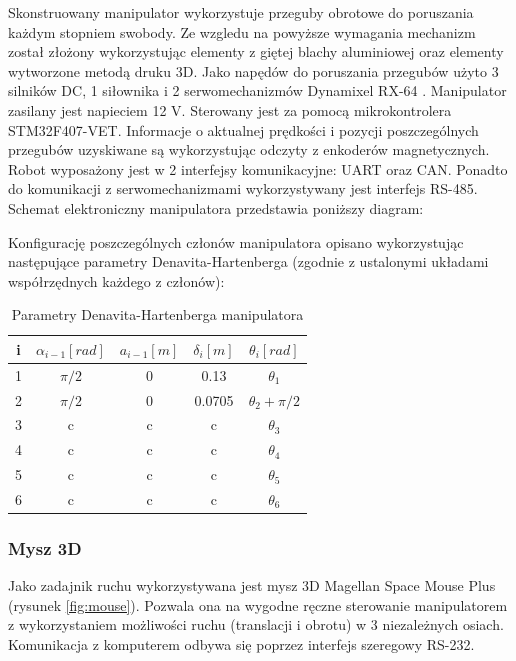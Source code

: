 \documentclass[a4paper, 12pt, twoside]{article}
\begin{document}
Skonstruowany manipulator wykorzystuje przeguby obrotowe do poruszania każdym stopniem swobody. Ze wzgledu na powyższe wymagania mechanizm został złożony wykorzystując elementy z giętej blachy aluminiowej oraz elementy wytworzone metodą druku 3D. Jako napędów do poruszania przegubów użyto 3 silników DC, 1 siłownika i 2 serwomechanizmów Dynamixel RX-64 \cite{servo}. Manipulator zasilany jest napieciem 12 V. Sterowany jest za pomocą mikrokontrolera STM32F407-VET. Informacje o aktualnej prędkości i pozycji poszczególnych przegubów uzyskiwane są wykorzystując odczyty z enkoderów magnetycznych. Robot wyposażony jest w 2 interfejsy komunikacyjne: UART oraz CAN. Ponadto do komunikacji z serwomechanizmami wykorzystywany jest interfejs RS-485. Schemat elektroniczny manipulatora przedstawia poniższy diagram:



Konfigurację poszczególnych członów manipulatora opisano wykorzystując następujące parametry Denavita-Hartenberga (zgodnie z ustalonymi układami współrzędnych każdego z członów):

\begin{table}[htb!]
\begin{center}
\caption{Parametry Denavita-Hartenberga manipulatora}
\begin{tabular}{ | c | c | c | c | c |}
\hline
 i & $\alpha_{i-1} [rad]$ & $a_{i-1} [m]$ & $\delta_{i} [m]$ & $\theta_{i} [rad]$ \\ 
\hline
 1 & $\pi/2$ & 0 & 0.13 & $\theta_{1}$ \\ 
\hline
 2 & $\pi/2$ & 0 & 0.0705 & $\theta_{2} + \pi/2$ \\
\hline
 3 & c & c & c & $\theta_{3}$ \\
\hline
 4 & c & c & c & $\theta_{4}$ \\ 
\hline
 5 & c & c & c & $\theta_{5}$ \\
\hline
 6 & c & c & c & $\theta_{6}$ \\
 \hline
\end{tabular}
\end{center}
\end{table}

\subsubsection{Mysz 3D}

Jako zadajnik ruchu wykorzystywana jest mysz 3D Magellan Space Mouse Plus \cite{spacemouse} (rysunek \ref{fig:mouse}). Pozwala ona na wygodne ręczne sterowanie manipulatorem z wykorzystaniem możliwości ruchu (translacji i obrotu) w 3 niezależnych osiach. Komunikacja z komputerem odbywa się poprzez interfejs szeregowy RS-232.
\end{document}
